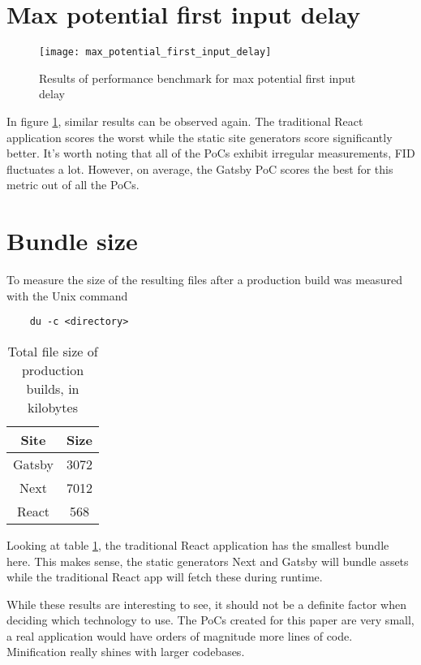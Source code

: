 \section{Max potential first input delay}

\begin{figure}[htb!]
	\texttt{[image: max\_potential\_first\_input\_delay]}
	\caption{Results of performance benchmark for max potential first input delay}
	\label{fig:max_potential_first_input_delay}
\end{figure}

In figure \ref{fig:max_potential_first_input_delay}, similar results can be observed again. 
The traditional React application scores the worst while the static site generators score significantly better.
It's worth noting that all of the PoCs exhibit irregular measurements, FID fluctuates a lot.
However, on average, the Gatsby PoC scores the best for this metric out of all the PoCs.

\section{Bundle size}

To measure the size of the resulting files after a production build was measured with the Unix command 

\begin{verbatim}
	du -c <directory>
\end{verbatim}

\begin{table}[htb!]
	\begin{center}
		\begin{tabular}{||c c||} 
			\hline
			Site   & Size \\ [0.5ex] 
			\hline\hline
			Gatsby & 3072 \\ 
			\hline
			Next   & 7012 \\
			\hline
			React  & 568  \\[1ex] 
			\hline
		\end{tabular}
		\caption{Total file size of production builds, in kilobytes }
		\label{tbl:bundle_size}
	\end{center}
\end{table}

Looking at table \ref{tbl:bundle_size}, the traditional React application has the smallest bundle here. 
This makes sense, the static generators Next and Gatsby will bundle assets while the traditional React app will fetch these during runtime.

While these results are interesting to see, it should not be a definite factor when deciding which technology to use.
The PoCs created for this paper are very small, a real application would have orders of magnitude more lines of code.
Minification really shines with larger codebases. 